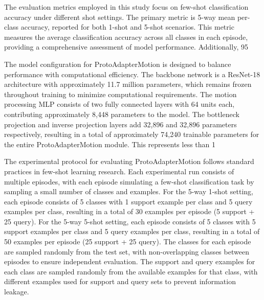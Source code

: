 \documentclass[11pt]{article}
\begin{document}
The evaluation metrics employed in this study focus on few-shot classification accuracy under different shot settings. The primary metric is 5-way mean per-class accuracy, reported for both 1-shot and 5-shot scenarios. This metric measures the average classification accuracy across all classes in each episode, providing a comprehensive assessment of model performance. Additionally, 95%

The model configuration for ProtoAdapterMotion is designed to balance performance with computational efficiency. The backbone network is a ResNet-18 architecture with approximately 11.7 million parameters, which remains frozen throughout training to minimize computational requirements. The motion processing MLP consists of two fully connected layers with 64 units each, contributing approximately 8,448 parameters to the model. The bottleneck projection and inverse projection layers add 32,896 and 32,896 parameters respectively, resulting in a total of approximately 74,240 trainable parameters for the entire ProtoAdapterMotion module. This represents less than 1%

The experimental protocol for evaluating ProtoAdapterMotion follows standard practices in few-shot learning research. Each experimental run consists of multiple episodes, with each episode simulating a few-shot classification task by sampling a small number of classes and examples. For the 5-way 1-shot setting, each episode consists of 5 classes with 1 support example per class and 5 query examples per class, resulting in a total of 30 examples per episode (5 support + 25 query). For the 5-way 5-shot setting, each episode consists of 5 classes with 5 support examples per class and 5 query examples per class, resulting in a total of 50 examples per episode (25 support + 25 query). The classes for each episode are sampled randomly from the test set, with non-overlapping classes between episodes to ensure independent evaluation. The support and query examples for each class are sampled randomly from the available examples for that class, with different examples used for support and query sets to prevent information leakage.
\end{document}
